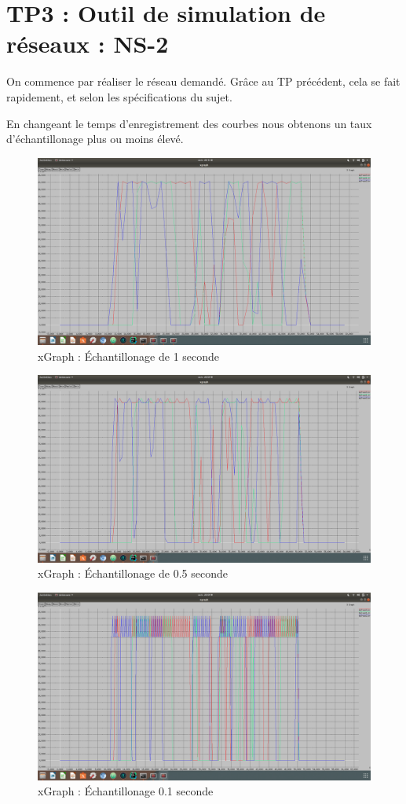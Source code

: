 \chapter{TP3 : Outil de simulation de réseaux : NS-2}
    On commence par réaliser le réseau demandé. Grâce au TP précédent, cela se fait rapidement, et selon les spécifications du sujet.

    En changeant le temps d'enregistrement des courbes nous obtenons un taux d'échantillonage plus ou moins élevé.
    \begin{figure}
      \centering
        \includegraphics[width=0.99\columnwidth]{./tp3/1,0.png}
        \caption{xGraph : Échantillonage de 1 seconde}
    \end{figure}

    \begin{figure}
      \centering
        \includegraphics[width=0.99\columnwidth]{./tp3/0,5.png}
        \caption{xGraph : Échantillonage de 0.5 seconde}
    \end{figure}

    \begin{figure}
      \centering
        \includegraphics[width=0.99\columnwidth]{./tp3/0,1.png}
        \caption{xGraph : Échantillonage 0.1 seconde}
    \end{figure}
